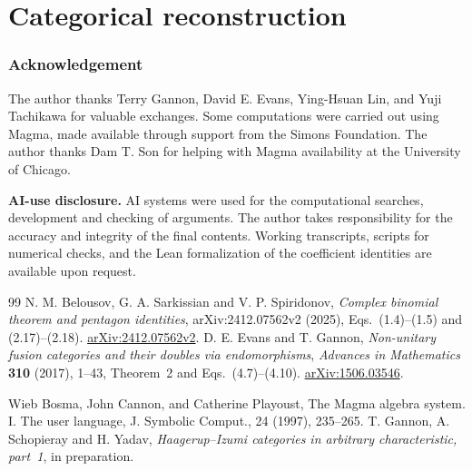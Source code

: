 \documentclass[11pt]{article}
\numberwithin{equation}{section}
\theoremstyle{definition}
\theoremstyle{remark}
\begin{document}
\part{Categorical reconstruction}
\label{part:reconstruction}

\section*{Acknowledgement}
The author thanks Terry Gannon, David E. Evans, Ying-Hsuan Lin, and Yuji Tachikawa for valuable exchanges. Some computations were carried out using Magma\cite{Magma}, made available through support from the Simons Foundation. The author thanks Dam T. Son for helping with Magma availability at the University of Chicago.

\noindent\textbf{AI-use disclosure.}
AI systems were used for the computational searches, development and
checking of arguments. The author takes responsibility for the accuracy
and integrity of the final contents. Working transcripts, scripts for
numerical checks, and the Lean formalization of the coefficient identities
are available upon request.

\begin{thebibliography}{99}
N. M. Belousov, G. A. Sarkissian and V. P. Spiridonov,
\emph{Complex binomial theorem and pentagon identities},
arXiv:2412.07562v2 (2025), Eqs.~(1.4)--(1.5) and (2.17)--(2.18).
\href{https://arxiv.org/abs/2412.07562v2}{arXiv:2412.07562v2}.
D. E. Evans and T. Gannon,
\emph{Non-unitary fusion categories and their doubles via endomorphisms},
\emph{Advances in Mathematics} \textbf{310} (2017), 1--43,
Theorem~2 and Eqs.~(4.7)--(4.10).
\href{https://arxiv.org/abs/1506.03546}{arXiv:1506.03546}.

 Wieb Bosma, John Cannon, and Catherine Playoust, The Magma algebra system. I. The user language, J. Symbolic Comput., 24 (1997), 235–265. 
T. Gannon, A. Schopieray and H. Yadav,
\emph{Haagerup--Izumi categories in arbitrary characteristic, part~1},
in preparation.
\end{thebibliography}
\end{document}
